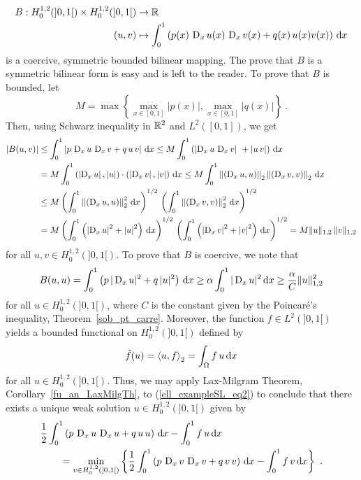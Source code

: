 \begin{egg}
\begin{align*}
B:H^{1,2}_0(]0,1[) \times H^{1,2}_0(]0,1[) &\rightarrow \mathbb{R} \\
(u,v) &\mapsto \int_0^1 \left( p(x)\,\operatorname{D}_x u(x)\,\operatorname{D}_x v(x) + q(x)\,u(x)
v(x)\right)\,\mathrm{d}{x}
\end{align*}
is a coercive, symmetric bounded bilinear mapping.  The prove that $B$
is a symmetric bilinear form is easy and is left to the reader.  To
prove that $B$ is bounded, let
\[
M = \max\left\{ \max_{x\in[0,1]} |p(x)| , \max_{x\in[0,1]} |q(x)| \right\} \ .
\]
Then, using Schwarz inequality in $\mathbb{R}^2$ and $\displaystyle L^2([0,1])$, we get
\begin{align*}
|B(u,v)| &\leq \int_0^1 \left| p\, \operatorname{D}_x u\,\operatorname{D}_x v + q\,u\,v \right| \,\mathrm{d}{x}
\leq M \int_0^1 \left( \left| \operatorname{D}_x u\, \operatorname{D}_x v \right|\
+ \left|u\, v\right|\right) \,\mathrm{d}{x} \\
&= M \int_0^1 \left( \left|\operatorname{D}_x u\right|,|u| \right)
\cdot \left( \left|\operatorname{D}_x v\right|, |v| \right) \,\mathrm{d}{x}
\leq M \int_0^1 \left\| \left(\operatorname{D}_x u, u\right)\right\|_2
\left\| \left(\operatorname{D}_x v, v\right)\right\|_2 \,\mathrm{d}{x} \\
&\leq M \left( \int_0^1 \left\|\left(\operatorname{D}_x u, u\right)\right\|_2^2
\,\mathrm{d}{x} \right)^{1/2} \, \left( \int_0^1 \left\|
\left(\operatorname{D}_x v, v\right)\right\|_2^2 \,\mathrm{d}{x}\right)^{1/2} \\
&= M\left( \int_0^1 \left(\left|\operatorname{D}_x u\right|^2+ \left|u\right|^2
\right) \,\mathrm{d}{x} \right)^{1/2} \, \left( \int_0^1 \left(
\left|\operatorname{D}_x v\right|^2 + \left|v\right|^2 \right) \,\mathrm{d}{x} \right)^{1/2}
= M\| u\|_{1,2} \, \|v\|_{1,2}
\end{align*}
for all $\displaystyle u,v \in H^{1,2}_0(]0,1[)$.
To prove that $B$ is coercive, we note that
\[
B(u,u) = \int_0^1 \left( p\,|\operatorname{D}_x u|^2 + q\,|u|^2 \right)\,\mathrm{d}{x}
\geq \alpha \int_0^1 |\operatorname{D}_x u|^2 \,\mathrm{d}{x} \geq \frac{\alpha}{C}
\|u\|_{1,2}^2
\]
for all $\displaystyle u \in H^{1,2}_0(]0,1[)$,
where $C$ is the constant given by the Poincar\'e's inequality,
Theorem~\ref{sob_pt_carre}.  Moreover, the function
$\displaystyle f \in L^2(]0,1[)$ yields a bounded functional on
$\displaystyle H^{1,2}_0(]0,1[)$ defined by
\[
\tilde{f}(u) = \left\langle{u} , {f}\right\rangle_2 = \int_\Omega f\, u \,\mathrm{d}{x}
\]
for all $\displaystyle u \in H^{1,2}_0(]0,1[)$.
Thus, we may apply Lax-Milgram Theorem, Corollary~\ref{fu_an_LaxMilgTh},
to (\ref{ell_exampleSL_eq2}) to
conclude that there exists a unique weak solution
$\displaystyle u \in H^{1,2}_0(]0,1[)$ given by
\begin{align*}
&\frac{1}{2} \int_0^1 \left( p\,\operatorname{D}_x u\, \operatorname{D}_x u + q\,u\,u \right) \,\mathrm{d}{x}
-\int_0^1 f\, u \,\mathrm{d}{x} \\
& \qquad = \min_{v\in H^{1,2}_0(]0,1[)} \left\{ \frac{1}{2}
\int_0^1 \left( p\,\operatorname{D}_x v\,\operatorname{D}_x v + q\,v\,v \right) \,\mathrm{d}{x}
-\int_0^1 f \, v \,\mathrm{d}{x} \right\} \ .
\end{align*}


\end{egg}
